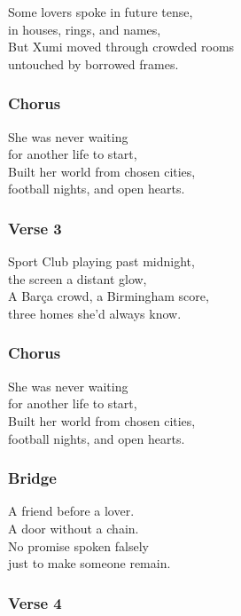Some lovers spoke in future tense,\\
in houses, rings, and names,\\
But Xumi moved through crowded rooms\\
untouched by borrowed frames.

\subsubsection{Chorus}\label{chorus-3}

She was never waiting\\
for another life to start,\\
Built her world from chosen cities,\\
football nights, and open hearts.

\subsubsection{Verse 3}\label{verse-3}

Sport Club playing past midnight,\\
the screen a distant glow,\\
A Barça crowd, a Birmingham score,\\
three homes she'd always know.

\subsubsection{Chorus}\label{chorus-4}

She was never waiting\\
for another life to start,\\
Built her world from chosen cities,\\
football nights, and open hearts.

\subsubsection{Bridge}\label{bridge}

A friend before a lover.\\
A door without a chain.\\
No promise spoken falsely\\
just to make someone remain.

\subsubsection{Verse 4}\label{verse-4}

